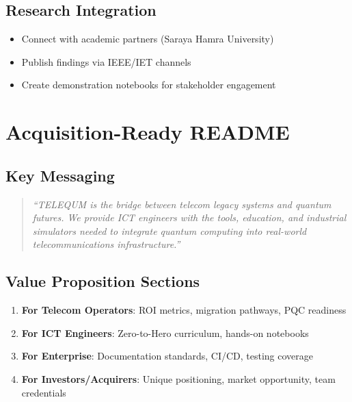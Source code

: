 \documentclass[11pt,a4paper]{article}
\begin{document}
\subsection{Research Integration}
\begin{itemize}
    \item Connect with academic partners (Saraya Hamra University)
    \item Publish findings via IEEE/IET channels
    \item Create demonstration notebooks for stakeholder engagement
\end{itemize}

\section{Acquisition-Ready README}
\label{sec:readme}

\subsection{Key Messaging}

\begin{quote}
\textit{``TELEQUM is the bridge between telecom legacy systems and quantum futures. We provide ICT engineers with the tools, education, and industrial simulators needed to integrate quantum computing into real-world telecommunications infrastructure.''}
\end{quote}

\subsection{Value Proposition Sections}

\begin{enumerate}
    \item \textbf{For Telecom Operators}: ROI metrics, migration pathways, PQC readiness
    \item \textbf{For ICT Engineers}: Zero-to-Hero curriculum, hands-on notebooks
    \item \textbf{For Enterprise}: Documentation standards, CI/CD, testing coverage
    \item \textbf{For Investors/Acquirers}: Unique positioning, market opportunity, team credentials
\end{enumerate}

\end{document}
